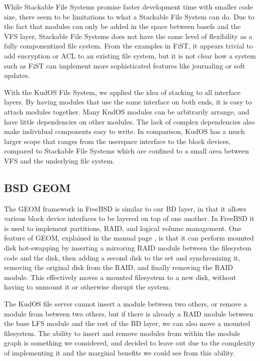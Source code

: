 While Stackable File Systems promise faster development time with smaller code
size, there seem to be limitations to what a Stackable File System can do.
Due to the fact that modules can only be added in the space between basefs and
the VFS layer, Stackable File Systems does not have the same level of
flexibility as a fully componentized file system. From the examples in FiST, it
appears trivial to add encryption or ACL to an existing file system, but it is
not clear how a system such as FiST can implement more sophisticated features
like journaling or soft updates.

With the KudOS File System, we applied the idea of stacking to all interface
layers. By having modules that use the same interface on both ends, it is easy
to attach modules together. Many KudOS modules can be arbitrarily arrange, and
have little dependencies on other modules. The lack of complex dependencies also
make individual components easy to write. In comparison, KudOS has a much larger
scope that ranges from the userspace interface to the block devices, compared to
Stackable File Systems which are confined to a small area between VFS and the
underlying file system.

\subsection{BSD GEOM}
\label{sec:related:geom}

The GEOM framework in FreeBSD is similar to our BD layer, in that it allows
various block device interfaces to be layered on top of one another. In FreeBSD
it is used to implement partitions, RAID, and logical volume management. One
feature of GEOM, explained in the manual page \cite{geom}, is that it can
perform mounted disk hot-swapping by inserting a mirroring RAID module between
the filesystem code and the disk, then adding a second disk to the set and
synchronizing it, removing the original disk from the RAID, and finally removing
the RAID module. This effectively moves a mounted filesystem to a new disk,
without having to unmount it or otherwise disrupt the system.

The KudOS file server cannot insert a module between two others, or remove a
module from between two others, but if there is already a RAID module between
the base LFS module and the rest of the BD layer, we can also move a mounted
filesystem. The ability to insert and remove modules from within the module
graph is something we considered, and decided to leave out due to the complexity
of implementing it and the marginal benefits we could see from this ability.

